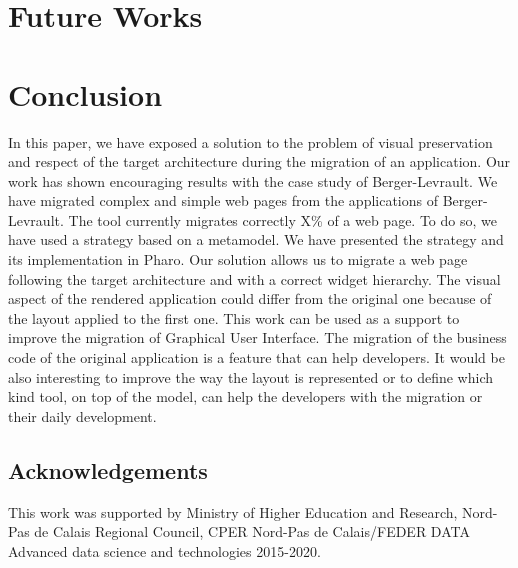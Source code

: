 \documentclass[conference]{IEEEtran}
\begin{document}
    
    
    \section{Future Works}
    \label{sec:future}
    
    
    \section{Conclusion}
    \label{sec:conclusion}
    
    
    In this paper, we have exposed a solution to the problem of visual preservation
        and respect of the target architecture during the migration of an application.
    Our work has shown encouraging results with the case study of Berger-Levrault.
    We have migrated complex and simple web pages from the applications of Berger-Levrault.
    The tool currently migrates correctly X\% of a web page. %
    To do so, we have used a strategy based on a metamodel.
    We have presented the strategy and its implementation in Pharo.
    Our solution allows us to migrate a web page following the target architecture and
        with a correct widget hierarchy.
    The visual aspect of the rendered application could differ from the original one because of
        the layout applied to the first one.
    This work can be used as a support to improve the migration of Graphical User Interface. 
    The migration of the business code of the original application is
        a feature that can help developers.
    It would be also interesting to improve the way the layout is represented or
        to define which kind tool, on top of the model, can help the developers 
        with the migration or their daily development.
     
    
    \subsection*{Acknowledgements} 
    This work was supported by Ministry of Higher Education and Research, Nord-Pas de Calais Regional Council, CPER Nord-Pas de Calais/FEDER DATA Advanced data science and technologies 2015-2020.
    
    
    
    
    
\end{document}
